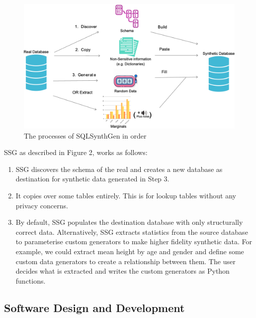 \documentclass[11pt]{article}
\begin{document}
\begin{figure}[ht]
\centering
\includegraphics[width=0.8\linewidth]{figures/SSG.png}
\caption{The processes of SQLSynthGen in order}
\label{fig:Range of fidelity for synthetic data}
\end{figure}

SSG as described in Figure 2, works as follows:

\begin{enumerate}
    \item SSG discovers the schema of the real and creates a new database as destination for synthetic data generated in Step 3.
    \item It copies over some tables entirely. This is for lookup tables without any privacy concerns.
    \item By default, SSG populates the destination database with only structurally correct data. Alternatively, SSG extracts statistics from the source database to parameterise custom generators to make higher fidelity synthetic data. For example, we could extract mean height by age and gender and define some custom data generators to create a relationship between them. The user decides what is extracted and writes the custom generators as Python functions.
\end{enumerate}

\subsection{Software Design and Development}



\end{document}
